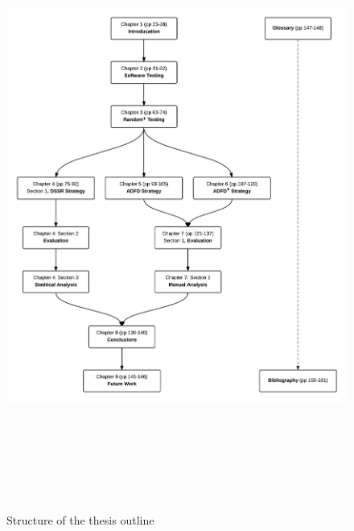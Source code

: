 \begin{figure}[!H]
	\centering
		\includegraphics[width=16cm, height=20cm ]{chapter1/thesisOutline5.png}
		\bigskip
		\caption{Structure of the thesis outline}
	\label{fig:thesisOutline}
\end{figure}


